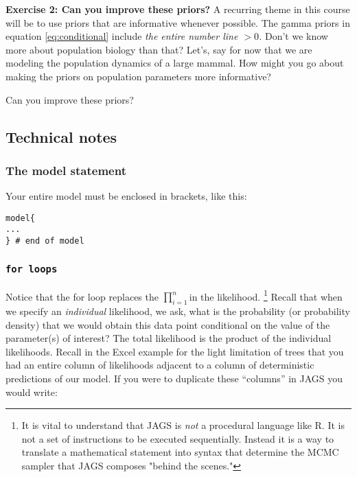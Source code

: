 \documentclass[12pt,english]{article}
\begin{document}
\bigskip
\belowcaptionskip=-40pt
\begin{exercise}
\begin{mdframed}
\doublespacing
\textbf{Exercise 2: Can you improve these priors?} A recurring theme in this course will be to use priors that are informative whenever possible. The gamma priors in equation \ref{eq:conditional} include \emph{the entire number line $>0$. }Don't we know more about population biology than that? Let's, say for now that we are modeling the population dynamics of a large mammal. How might you go about making the priors on population parameters more informative? 
\end{mdframed}
\captionsetup{textformat=empty, labelformat=empty}
\caption{Can you improve these priors?}
\label{ex:ImprovePriors}
\end{exercise}
\belowcaptionskip=0pt

\subsection{Technical notes}

\subsubsection{The model statement }

Your entire model must be enclosed in brackets, like this: 

\begin{Verbatim}
model{
...
} # end of model

\end{Verbatim}

\subsubsection{\texttt{for loops}}

Notice that the for loop replaces the $\prod_{i=1}^{n}$in the likelihood. \footnote{It is vital to understand that JAGS is \emph{not} a procedural language like R.  It is not a set of instructions to be executed sequentially. Instead it is a way to translate a mathematical statement into syntax that determine the MCMC sampler that JAGS composes "behind the scenes." } Recall that when we specify an \emph{individual} likelihood, we ask, what is the probability (or probability density) that we would obtain this data point conditional on the value of the parameter(s) of interest? The total likelihood is the product of the individual likelihoods. Recall in the Excel example for the light limitation of trees that you had an entire column of likelihoods adjacent to a column of deterministic predictions of our model. If you were to duplicate these \enquote{columns} in JAGS you would write:
\end{document}
